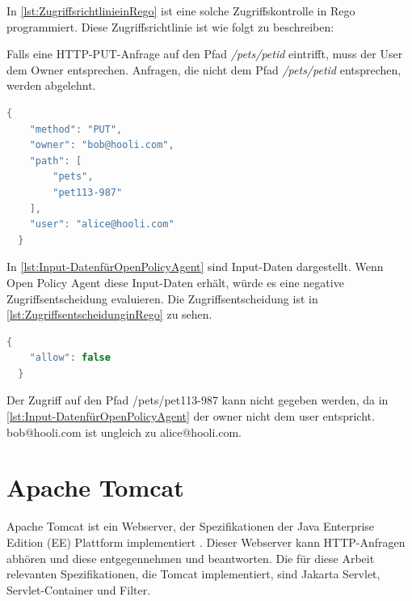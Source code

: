 In \autoref{lst:ZugriffsrichtlinieinRego} \citep{opaplayground:2021} ist eine solche Zugriffskontrolle in Rego programmiert. Diese Zugriffsrichtlinie ist wie folgt zu beschreiben:\smallskip

Falls eine HTTP-PUT-Anfrage auf den Pfad \emph{/pets/{petid}} eintrifft, muss der User dem 
Owner entsprechen. Anfragen, die nicht dem Pfad \emph{/pets/{petid}} entsprechen, werden abgelehnt. 

\begin{lstlisting}[language=C++,frame=tb,caption={Input-Daten für Open Policy Agent},label=lst:Input-DatenfürOpenPolicyAgent]
  {
    "method": "PUT",
    "owner": "bob@hooli.com",
    "path": [
        "pets",
        "pet113-987"
    ],
    "user": "alice@hooli.com"
  }
\end{lstlisting}
\smallskip

In \autoref{lst:Input-DatenfürOpenPolicyAgent} sind Input-Daten dargestellt. Wenn Open Policy Agent diese Input-Daten erhält, würde es eine negative Zugriffsentscheidung evaluieren. Die Zugriffsentscheidung ist in \autoref{lst:ZugriffsentscheidunginRego} zu sehen.

\begin{lstlisting}[language=C++,frame=tb,caption={Zugriffsentscheidung in Rego},label=lst:ZugriffsentscheidunginRego]
  {
    "allow": false
  }
\end{lstlisting}
\smallskip

Der Zugriff auf den Pfad /pets/pet113-987 kann nicht gegeben werden, da in \autoref{lst:Input-DatenfürOpenPolicyAgent} der owner nicht dem user entspricht. bob@hooli.com ist ungleich zu alice@hooli.com. 

\section{Apache Tomcat}
Apache Tomcat ist ein Webserver, der Spezifikationen der Java Enterprise Edition (EE) Plattform implementiert
\citep{tomcat:2021}. Dieser Webserver kann HTTP-Anfragen abhören und diese entgegennehmen und 
beantworten. Die für diese Arbeit relevanten Spezifikationen, die Tomcat implementiert, sind Jakarta Servlet, Servlet-Container
und Filter.

